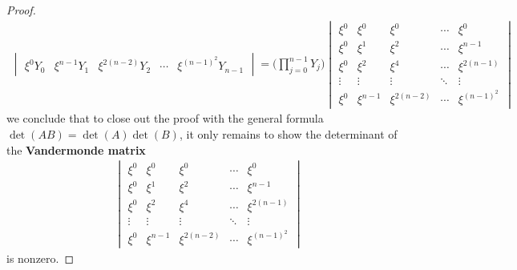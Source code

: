 \documentclass{report}
\begin{document}
\begin{proof}
\begin{align*}
\begin{vmatrix}
  \xi^0Y_0 & \xi^{n-1}Y_1 & \xi^{2(n-2)} Y_2& \cdots & \xi^{(n-1)^2}Y_{n-1}
\end{vmatrix}= \Big( \prod_{j=0}^{n-1} Y_j \Big)\begin{vmatrix} 
  \xi^0 & \xi^0& \xi^0 & \cdots & \xi^0 \\
  \xi^0 & \xi^1 & \xi^2 & \cdots & \xi^{n-1} \\
  \xi^0 & \xi^2 & \xi^4 & \cdots & \xi^{2(n-1)}  \\
  \vdots & \vdots & \vdots & \ddots & \vdots \\
  \xi^0 & \xi^{n-1} & \xi^{2(n-2)}& \cdots & \xi^{(n-1)^2}
\end{vmatrix}
\end{align*}
we conclude that to close out the proof with the general formula $\operatorname{det}(AB)=\operatorname{det}(A)\operatorname{det}(B)$, it only remains to show the determinant of the \textbf{Vandermonde matrix} 
\begin{align*}
\begin{vmatrix} 
  \xi^0 & \xi^0& \xi^0 & \cdots & \xi^0 \\
  \xi^0 & \xi^1 & \xi^2 & \cdots & \xi^{n-1} \\
  \xi^0 & \xi^2 & \xi^4 & \cdots & \xi^{2(n-1)}  \\
  \vdots & \vdots & \vdots & \ddots & \vdots \\
  \xi^0 & \xi^{n-1} & \xi^{2(n-2)}& \cdots & \xi^{(n-1)^2}
\end{vmatrix}
\end{align*}
is nonzero. 
\end{proof}
\end{document}
